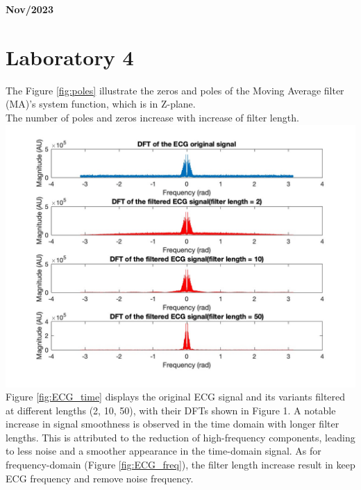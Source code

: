 \documentclass[8pt]{article}  %
\theoremstyle{plain}
\theoremstyle{definition}
\theoremstyle{remark}
\begin{document}
    
    \small{}
    \begin{flushright}
    \textbf{Nov/2023}
    \end{flushright}
    \section{Laboratory 4}

    \begin{minipage}{0.49\textwidth}    
    The Figure \ref{fig:poles} illustrate the zeros and poles of the Moving Average filter (MA)'s system function,
    which is in Z-plane.\\
    The number of poles and zeros increase with increase of filter length.\\
    \includegraphics[width=\linewidth]{figure/figure_2.jpg}
    \label{fig:ECG_freq}
    \vspace{0.3cm}
    Figure \ref{fig:ECG_time} displays the original ECG signal and its variants filtered at different lengths (2, 10, 50), 
    with their DFTs shown in Figure 1. 
    A notable increase in signal smoothness is observed in the time domain with longer filter lengths. 
    This is attributed to the reduction of high-frequency components, 
    leading to less noise and a smoother appearance in the time-domain signal.
    As for frequency-domain (Figure \ref{fig:ECG_freq}), 
    the filter length increase result in keep ECG frequency and remove noise frequency.
    \end{minipage}
\end{document}
